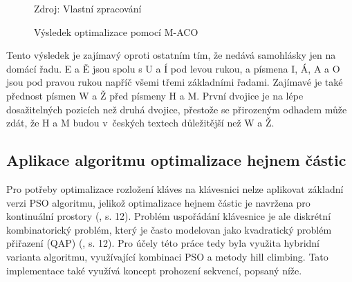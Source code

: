 \documentclass[a4paper, twoside, 12pt, czech]{article}
\begin{document}
\begin{figure}[h]
    \centering
    \caption{Výsledek optimalizace pomocí M-ACO}
    \vspace{0.5cm}
    \begin{keyboardlayout}
                     
        \newrow
        
                     
        \newrow
        
                    
        \newrow
        
                   
        \newrow
        
               
    \end{keyboardlayout}
    \small{Zdroj: Vlastní zpracování}
    \label{pic:maco}
\end{figure}

Tento výsledek je zajímavý oproti ostatním tím, že nedává samohlásky jen na 
domácí řadu. E a Ě jsou spolu s U a Í pod levou rukou, a písmena I, Á, A a O jsou
pod pravou rukou napříč všemi třemi základními řadami. Zajímavé je také přednost 
písmen W a Ž před písmeny H a M. První dvojice je na lépe dosažitelných pozicích 
než druhá dvojice, přestože se přirozeným odhadem může zdát, že H a M budou v~českých 
textech důležitější než W a Ž.

\subsection{Aplikace algoritmu optimalizace hejnem částic}
Pro potřeby optimalizace rozložení kláves na klávesnici nelze aplikovat základ\-ní 
verzi PSO algoritmu, jelikož optimalizace hejnem částic je navržena pro kontinuální 
prostory (\cite{pso-overview}, s. 12). Problém uspořádání klávesnice je ale diskrétní
kombinatorický problém, který je často modelovan jako kvadratický problém přiřaze\-ní 
(QAP) (\cite{Dey2024-nk}, s. 12). Pro účely této práce tedy byla využita hybridní 
varianta algoritmu, využívající kombinaci PSO a metody hill climbing. Tato implementace 
také využívá koncept prohození sekvencí, popsaný níže.
\end{document}
